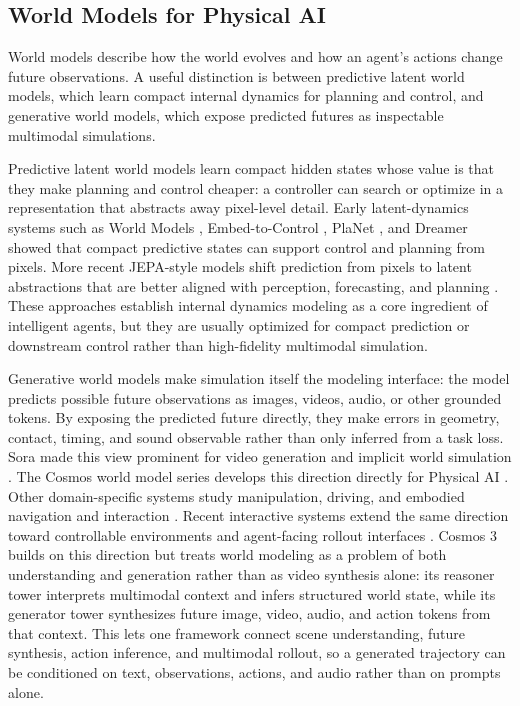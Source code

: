 \documentclass{llmxive}
\begin{document}
\subsection{World Models for Physical AI}
World models describe how the world evolves and how an agent's actions change future observations.
A useful distinction is between predictive latent world models, which learn compact internal dynamics for planning and control, and generative world models, which expose predicted futures as inspectable multimodal simulations.

Predictive latent world models learn compact hidden states whose value is that they make planning and control cheaper: a controller can search or optimize in a representation that abstracts away pixel-level detail.
Early latent-dynamics systems such as World Models \citep{ha2018world}, Embed-to-Control \citep{watter2015embed}, PlaNet \citep{hafner2018planet}, and Dreamer \citep{hafner2019dream} showed that compact predictive states can support control and planning from pixels.
More recent JEPA-style models shift prediction from pixels to latent abstractions that are better aligned with perception, forecasting, and planning \citep{lecun2022path,assran2023ijepa,bardes2024vjepa,assran2025v,leworldmodel}.
These approaches establish internal dynamics modeling as a core ingredient of intelligent agents, but they are usually optimized for compact prediction or downstream control rather than high-fidelity multimodal simulation.

Generative world models make simulation itself the modeling interface: the model predicts possible future observations as images, videos, audio, or other grounded tokens.
By exposing the predicted future directly, they make errors in geometry, contact, timing, and sound observable rather than only inferred from a task loss.
Sora \citep{sora} made this view prominent for video generation and implicit world simulation \citep{he2025pre}.
The Cosmos world model series develops this direction directly for Physical AI \citep{cosmos_predict2,cosmos_predict2p5,cosmos_transfer1,cosmos_v1}.
Other domain-specific systems study manipulation, driving, and embodied navigation and interaction \citep{wang2023drivedreamer,zhao2025drivedreamer,liang2024dreamitate,jang2025dreamgen,ren2025cosmos,robodreamer,gao2026dreamdojo}.
Recent interactive systems extend the same direction toward controllable environments and agent-facing rollout interfaces \citep{bruce2024genie,genie2,genie3,gaia1,unisim,worldlabs2025marble,bahmani2025lyra,shen2026lyra2,waymo_world_model,li2025wonderplay,wang2025embodiedgen}.
Cosmos 3 builds on this direction but treats world modeling as a problem of both understanding and generation rather than as video synthesis alone: its reasoner tower interprets multimodal context and infers structured world state, while its generator tower synthesizes future image, video, audio, and action tokens from that context.
This lets one framework connect scene understanding, future synthesis, action inference, and multimodal rollout, so a generated trajectory can be conditioned on text, observations, actions, and audio rather than on prompts alone.
\end{document}
